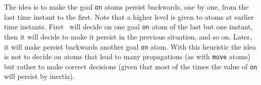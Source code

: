  The idea is to make the goal \texttt{on} atoms persist backwards, one by one, from the last time instant to the first. 
 Note that a higher level is given to atoms at earlier time instants. 
 First \clasp\ will decide on one goal \texttt{on} atom of the last but one instant,  
 then it will decide to make it persist in the previous situation, and so on.  
 Later, it will make persist backwards another goal \texttt{on} atom. 
 With this heuristic the idea is not to decide on atoms that lead to many propagations (as with \texttt{move} atoms) 
 but rather to make correct decisions (given that most of the times the value of \texttt{on} will persist by inertia). 

\iffalse

\fi
